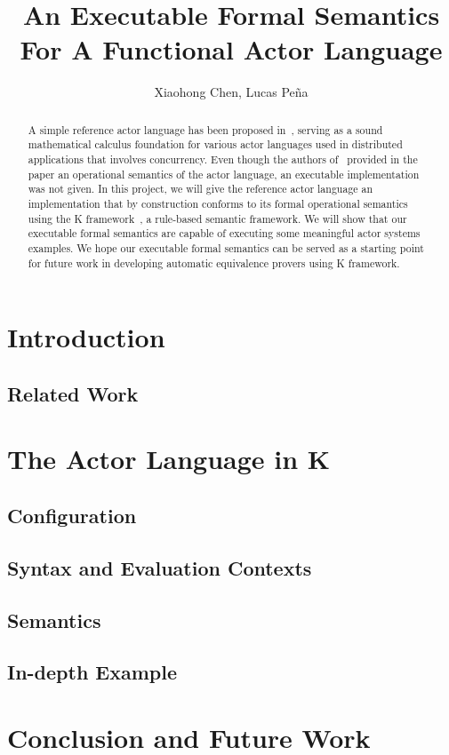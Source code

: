 \documentclass{llncs}
\begin{document}
%
\mainmatter              %
%
\title{An Executable Formal Semantics For A Functional Actor Language}
%
\author{Xiaohong Chen, Lucas Pe\~{n}a}
%

\maketitle              %

\begin{abstract}
A simple reference actor language has been proposed in~\cite{}, serving as a sound mathematical calculus foundation for various actor languages used in distributed applications that involves concurrency. Even though the authors of~\cite{} provided in the paper an operational semantics of the actor language, an executable implementation was not given. In this project, we will give the reference actor language an implementation that by construction conforms to its formal operational semantics using the K framework~\cite{}, a rule-based semantic framework. We will show that our executable formal semantics are capable of executing some meaningful actor systems examples. We hope our executable formal semantics can be served as a starting point for future work in developing automatic equivalence provers using K framework.
\end{abstract}
%
\section{Introduction}
\subsection{Related Work}

\section{The Actor Language in K}
\subsection{Configuration}
\subsection{Syntax and Evaluation Contexts}
\subsection{Semantics}
\subsection{In-depth Example}

\section{Conclusion and Future Work}

%
%



\end{document}

